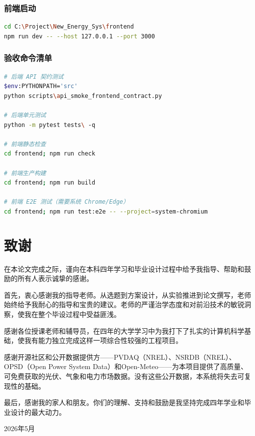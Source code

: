 \documentclass[12pt,a4paper]{ctexbook}
\begin{document}
\subsection*{前端启动}

\begin{lstlisting}[language=bash, caption={前端开发服务器启动}]
cd C:\Project\New_Energy_Sys\frontend
npm run dev -- --host 127.0.0.1 --port 3000
\end{lstlisting}

\subsection*{验收命令清单}

\begin{lstlisting}[language=bash, caption={验收命令}]
# 后端 API 契约测试
$env:PYTHONPATH='src'
python scripts\api_smoke_frontend_contract.py

# 后端单元测试
python -m pytest tests\ -q

# 前端静态检查
cd frontend; npm run check

# 前端生产构建
cd frontend; npm run build

# 前端 E2E 测试（需要系统 Chrome/Edge）
cd frontend; npm run test:e2e -- --project=system-chromium
\end{lstlisting}

\chapter*{致谢}

在本论文完成之际，谨向在本科四年学习和毕业设计过程中给予我指导、帮助和鼓励的所有人表示诚挚的感谢。

首先，衷心感谢我的指导老师。从选题到方案设计，从实验推进到论文撰写，老师始终给予我耐心的指导和宝贵的建议。老师的严谨治学态度和对前沿技术的敏锐洞察，使我在整个毕设过程中受益匪浅。

感谢各位授课老师和辅导员，在四年的大学学习中为我打下了扎实的计算机科学基础，使我有能力独立完成这样一项综合性较强的工程项目。

感谢开源社区和公开数据提供方——PVDAQ（NREL）、NSRDB（NREL）、OPSD（Open Power System Data）和Open-Meteo——为本项目提供了高质量、可免费获取的光伏、气象和电力市场数据。没有这些公开数据，本系统将失去可复现性的基础。

最后，感谢我的家人和朋友。你们的理解、支持和鼓励是我坚持完成四年学业和毕业设计的最大动力。

\vspace{2cm}

\begin{flushright}
2026年5月
\end{flushright}
\end{document}
